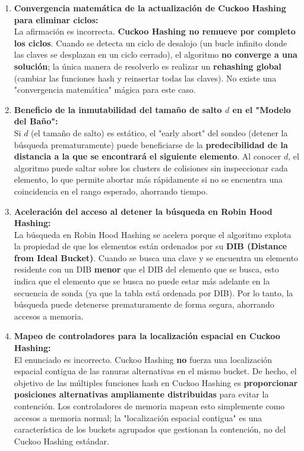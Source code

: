 \documentclass[12pt,a4paper]{report}
\begin{document}
\begin{enumerate}
    \item \textbf{Convergencia matemática de la actualización de Cuckoo Hashing para eliminar ciclos:}\\
    La afirmación es incorrecta. \textbf{Cuckoo Hashing no remueve por completo los ciclos}. Cuando se detecta un ciclo de desalojo (un bucle infinito donde las claves se desplazan en un ciclo cerrado), el algoritmo \textbf{no converge a una solución}; la única manera de resolverlo es realizar un \textbf{rehashing global} (cambiar las funciones hash y reinsertar todas las claves). No existe una "convergencia matemática" mágica para este caso.
    \item \textbf{Beneficio de la inmutabilidad del tamaño de salto $d$ en el "Modelo del Baño":}\\
    Si $d$ (el tamaño de salto) es estático, el "early abort" del sondeo (detener la búsqueda prematuramente) puede beneficiarse de la \textbf{predecibilidad de la distancia a la que se encontrará el siguiente elemento}. Al conocer $d$, el algoritmo puede saltar sobre los clusters de colisiones sin inspeccionar cada elemento, lo que permite abortar más rápidamente si no se encuentra una coincidencia en el rango esperado, ahorrando tiempo.
    \item \textbf{Aceleración del acceso al detener la búsqueda en Robin Hood Hashing:}\\
    La búsqueda en Robin Hood Hashing se acelera porque el algoritmo explota la propiedad de que los elementos están ordenados por su \textbf{DIB (Distance from Ideal Bucket)}. Cuando se busca una clave y se encuentra un elemento residente con un DIB \textbf{menor} que el DIB del elemento que se busca, esto indica que el elemento que se busca no puede estar más adelante en la secuencia de sonda (ya que la tabla está ordenada por DIB). Por lo tanto, la búsqueda puede detenerse prematuramente de forma segura, ahorrando accesos a memoria.
    \item \textbf{Mapeo de controladores para la localización espacial en Cuckoo Hashing:}\\
    El enunciado es incorrecto. Cuckoo Hashing \textbf{no} fuerza una localización espacial contigua de las ranuras alternativas en el mismo bucket. De hecho, el objetivo de las múltiples funciones hash en Cuckoo Hashing es \textbf{proporcionar posiciones alternativas ampliamente distribuidas} para evitar la contención. Los controladores de memoria mapean esto simplemente como accesos a memoria normal; la "localización espacial contigua" es una característica de los buckets agrupados que gestionan la contención, no del Cuckoo Hashing estándar.

\end{enumerate}
\end{document}
